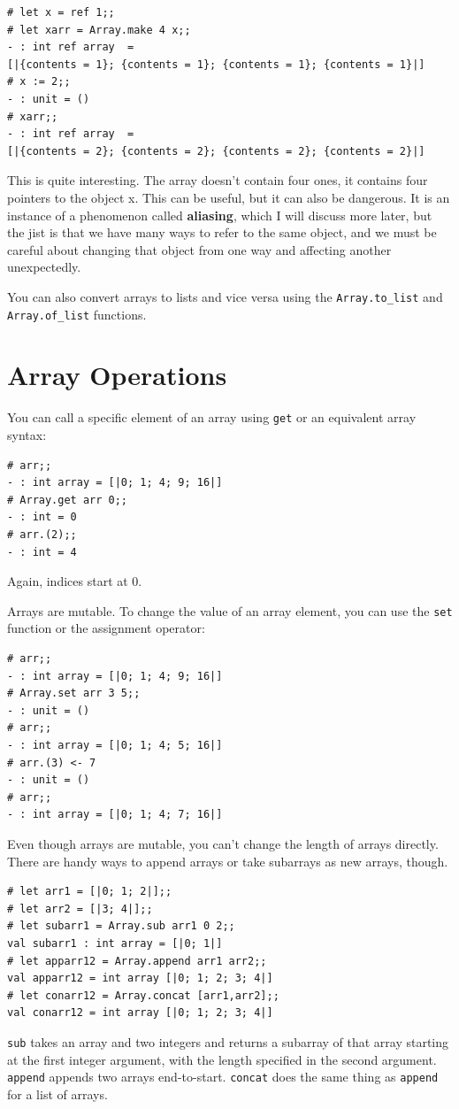 \documentclass[10pt]{book}
\begin{document}
\beforeverb
\begin{verbatim}
# let x = ref 1;;
# let xarr = Array.make 4 x;;
- : int ref array  = 
[|{contents = 1}; {contents = 1}; {contents = 1}; {contents = 1}|]
# x := 2;;
- : unit = ()
# xarr;;
- : int ref array  = 
[|{contents = 2}; {contents = 2}; {contents = 2}; {contents = 2}|]
\end{verbatim}
\afterverb

This is quite interesting. The array doesn't contain four ones, it contains
four pointers to the object x. This can be useful, but it can also be dangerous.
It is an instance of a phenomenon called {\bf aliasing}, which I will discuss more
later, but the jist is that we have many ways to refer to the same object, and we 
must be careful about changing that object from one way and affecting another unexpectedly.

You can also convert arrays to lists and vice versa using 
the \verb"Array.to_list" and
\verb"Array.of_list" functions.

\section{Array Operations}

You can call a specific element of an array using {\tt get} 
or an equivalent array syntax:

\beforeverb
\begin{verbatim}
# arr;;
- : int array = [|0; 1; 4; 9; 16|]
# Array.get arr 0;;
- : int = 0
# arr.(2);;
- : int = 4
\end{verbatim}
\afterverb
Again, indices start at 0.

Arrays are mutable. To change the value of an array 
element, you can use the {\tt set} function or the 
assignment operator:

\beforeverb
\begin{verbatim}
# arr;;
- : int array = [|0; 1; 4; 9; 16|]
# Array.set arr 3 5;;
- : unit = ()
# arr;;
- : int array = [|0; 1; 4; 5; 16|]
# arr.(3) <- 7
- : unit = ()
# arr;;
- : int array = [|0; 1; 4; 7; 16|]
\end{verbatim}
\afterverb

Even though arrays are mutable, you can't change the length 
of arrays directly. There are handy ways to append arrays 
or take subarrays as new arrays, though.

\beforeverb
\begin{verbatim}
# let arr1 = [|0; 1; 2|];;
# let arr2 = [|3; 4|];;
# let subarr1 = Array.sub arr1 0 2;;
val subarr1 : int array = [|0; 1|]
# let apparr12 = Array.append arr1 arr2;;
val apparr12 = int array [|0; 1; 2; 3; 4|]
# let conarr12 = Array.concat [arr1,arr2];;
val conarr12 = int array [|0; 1; 2; 3; 4|]
\end{verbatim}
\afterverb
{\tt sub} takes an array and two integers and returns a 
subarray of that array starting at the first integer 
argument, with the length specified in the second argument. 
{\tt append} appends two arrays end-to-start. {\tt concat} 
does the same thing as {\tt append} for a list of arrays.
\end{document}
